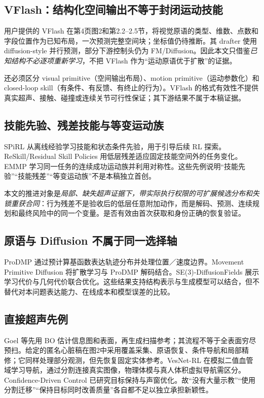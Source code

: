 \documentclass[UTF8,fontset=fandol,11pt,a4paper]{ctexart}
\theoremstyle{plain}
\theoremstyle{definition}
\theoremstyle{remark}
\numberwithin{equation}{section}
\begin{document}
\subsection{VFlash：结构化空间输出不等于封闭运动技能}
用户提供的 VFlash 在第4页图2和第2.2--2.5节，将视觉原语的类型、维数、点数和字段位置作为已知布局，一次预测完整空间块；坐标值仍待推断。其 drafter 使用 diffusion-style 并行预测，部分下游控制头仍为 FM/Diffusion。因此本文只借鉴\emph{已知结构不必逐项重新学习}，不把 VFlash 作为“运动原语优于扩散”的证据\cite{vflash}。

还必须区分 visual primitive（空间输出布局）、motion primitive（运动参数化）和 closed-loop skill（有条件、有反馈、有终止的行为）。VFlash 的格式有效性不提供真实超声、接触、碰撞或连续关节可行性保证；其下游结果不属于本稿证据。

\subsection{技能先验、残差技能与等变运动族}
SPiRL 从离线经验学习技能和状态条件先验，用于引导后续 RL 探索\cite{spirl}。ReSkill/Residual Skill Policies 用低层残差适应固定技能空间外的任务变化\cite{reskill}。EMMP 学习同一任务的连续成功运动族并利用对称性\cite{emmp}。这些先例说明“技能先验”“技能残差”“等变运动族”不是本稿独立首创。

本文的推进对象是\emph{局部、缺失超声证据下，带实际执行权限的可扩展候选分布和失锁重获合同}：行为残差不是验收后的低层任意附加动作，而是解码、预测、连续规划和最终风险中的同一个变量。是否有效由首次获取和身份正确的恢复验证。

\subsection{原语与 Diffusion 不属于同一选择轴}
ProDMP 通过预计算基函数表达轨迹分布并处理位置／速度边界\cite{prodmp}。Movement Primitive Diffusion 将扩散学习与 ProDMP 解码结合\cite{mpdiff}。SE(3)-DiffusionFields 展示学习代价与几何代价联合优化\cite{difffields}。这些结果支持结构表示与生成模型可以结合，但不替代对本问题表达能力、在线成本和模型误差的比较。

\subsection{直接超声先例}
Goel 等先用 BO 估计信息图和表面，再生成扫描参考；其流程不等于全表面穷尽预扫\cite{goel}。给定的匿名心脏稿在图2中采用覆盖采集、原语恢复、条件导航和局部精修；它同样处理部分观测，但先恢复固定实体参考\cite{cardiac}。VesNet-RL 在模拟二值血管域学习导航，通过分割连接真实图像，物理体模与真人体积虚拟导航需区分\cite{vesnet}。Confidence-Driven Control 已研究目标保持与声窗优化\cite{confidence}。故“没有大量示教”“使用分割迁移”“保持目标同时改善质量”各自都不足以独立承担新颖性。
\end{document}
